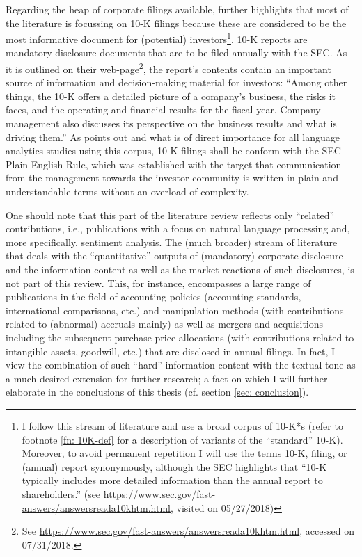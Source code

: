 Regarding the heap of corporate filings available, \textcite[227]{Das2014} further highlights that most of the literature is focussing on 10-K filings because these are considered to be the most informative document for (potential) investors\footnote{I follow this stream of literature and use a broad corpus of 10-K*s (refer to footnote \ref{fn: 10K-def} for a description of variants of the \enquote{standard} 10-K). Moreover, to avoid permanent repetition I will use the terms 10-K, filing, or (annual) report synonymously, although the SEC highlights that \enquote{10-K typically includes more detailed information than the annual report to shareholders.} (see \url{https://www.sec.gov/fast-answers/answersreada10khtm.html}, visited on 05/27/2018)}. 10-K reports are mandatory disclosure documents that are to be filed annually with the SEC. As it is outlined on their web-page\footnote{See \url{https://www.sec.gov/fast-answers/answersreada10khtm.html}, accessed on 07/31/2018.}, the report's contents contain an important source of information and decision-making material for investors: \enquote{Among other things, the 10-K offers a detailed picture of a company's business, the risks it faces, and the operating and financial results for the fiscal year. Company management also discusses its perspective on the business results and what is driving them.} As \textcite{Pulliza2015} points out and what is of direct importance for all language analytics studies using this corpus, 10-K filings shall be conform with the SEC Plain English Rule, which was established with the target that communication from the management towards the investor community is written in plain and understandable terms without an overload of complexity.

One should note that this part of the literature review reflects only \enquote{related} contributions, i.e., publications with a focus on natural language processing and, more specifically, sentiment analysis. The (much broader) stream of literature that deals with the \enquote{quantitative} outputs of (mandatory) corporate disclosure and the information content as well as the market reactions of such disclosures, is not part of this review. This, for instance, encompasses a large range of publications in the field of accounting policies (accounting standards, international comparisons, etc.) and manipulation methods (with contributions related to (abnormal) accruals mainly) as well as mergers and acquisitions including the subsequent purchase price allocations (with contributions related to intangible assets, goodwill, etc.) that are disclosed in annual filings. In fact, I view the combination of such \enquote{hard} information content with the textual tone as a much desired extension for further research; a fact on which I will further elaborate in the conclusions of this thesis (cf. section \ref{sec: conclusion}). 

